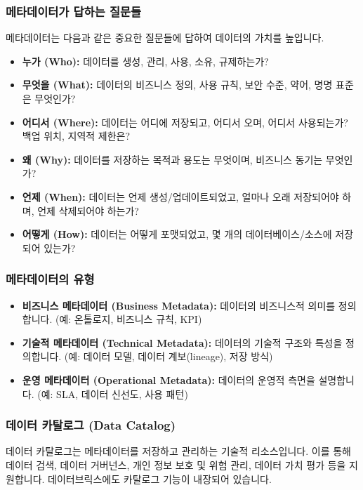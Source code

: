 \documentclass[11pt,a4paper]{article}
\begin{document}
\subsubsection{메타데이터가 답하는 질문들}
메타데이터는 다음과 같은 중요한 질문들에 답하여 데이터의 가치를 높입니다.
\begin{itemize}
    \item \textbf{누가 (Who):} 데이터를 생성, 관리, 사용, 소유, 규제하는가?
    \item \textbf{무엇을 (What):} 데이터의 비즈니스 정의, 사용 규칙, 보안 수준, 약어, 명명 표준은 무엇인가?
    \item \textbf{어디서 (Where):} 데이터는 어디에 저장되고, 어디서 오며, 어디서 사용되는가? 백업 위치, 지역적 제한은?
    \item \textbf{왜 (Why):} 데이터를 저장하는 목적과 용도는 무엇이며, 비즈니스 동기는 무엇인가?
    \item \textbf{언제 (When):} 데이터는 언제 생성/업데이트되었고, 얼마나 오래 저장되어야 하며, 언제 삭제되어야 하는가?
    \item \textbf{어떻게 (How):} 데이터는 어떻게 포맷되었고, 몇 개의 데이터베이스/소스에 저장되어 있는가?
\end{itemize}

\subsubsection{메타데이터의 유형}
\begin{itemize}
    \item \textbf{비즈니스 메타데이터 (Business Metadata):} 데이터의 비즈니스적 의미를 정의합니다. (예: 온톨로지, 비즈니스 규칙, KPI)
    \item \textbf{기술적 메타데이터 (Technical Metadata):} 데이터의 기술적 구조와 특성을 정의합니다. (예: 데이터 모델, 데이터 계보(lineage), 저장 방식)
    \item \textbf{운영 메타데이터 (Operational Metadata):} 데이터의 운영적 측면을 설명합니다. (예: SLA, 데이터 신선도, 사용 패턴)
\end{itemize}

\subsubsection{데이터 카탈로그 (Data Catalog)}
데이터 카탈로그는 메타데이터를 저장하고 관리하는 기술적 리소스입니다. 이를 통해 데이터 검색, 데이터 거버넌스, 개인 정보 보호 및 위험 관리, 데이터 가치 평가 등을 지원합니다. 데이터브릭스에도 카탈로그 기능이 내장되어 있습니다.
\end{document}
